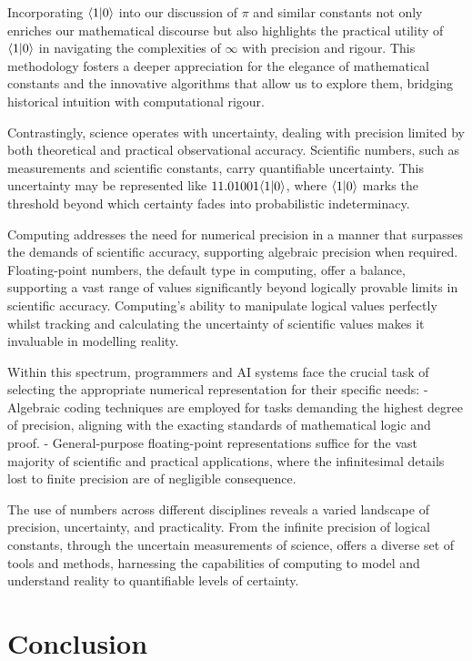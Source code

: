 \documentclass[12pt]{article}
\begin{document}
Incorporating \(\langle 1 | 0 \rangle\) into our discussion of \(\pi\) and similar constants not only enriches our mathematical discourse but also highlights the practical utility of \(\langle 1 | 0 \rangle\) in navigating the complexities of \(\infty\) with precision and rigour. This methodology fosters a deeper appreciation for the elegance of mathematical constants and the innovative algorithms that allow us to explore them, bridging historical intuition with computational rigour.

Contrastingly, science operates with uncertainty, dealing with precision limited by both theoretical and practical observational accuracy. Scientific numbers, such as measurements and scientific constants, carry quantifiable uncertainty. This uncertainty may be represented like \(11.01001\langle 1 | 0 \rangle\), where \(\langle 1 | 0 \rangle\) marks the threshold beyond which certainty fades into probabilistic indeterminacy.

Computing addresses the need for numerical precision in a manner that surpasses the demands of scientific accuracy, supporting algebraic precision when required. Floating-point numbers, the default type in computing, offer a balance, supporting a vast range of values significantly beyond logically provable \qbit{} limits in scientific accuracy. Computing's ability to manipulate logical values perfectly whilst tracking and calculating the uncertainty of scientific values makes it invaluable in modelling reality.

Within this spectrum, programmers and AI systems face the crucial task of selecting the appropriate numerical representation for their specific needs:
- Algebraic coding techniques are employed for tasks demanding the highest degree of precision, aligning with the exacting standards of mathematical logic and proof.
- General-purpose floating-point representations suffice for the vast majority of scientific and practical applications, where the infinitesimal details lost to finite precision are of negligible consequence.

The use of numbers across different disciplines reveals a varied landscape of precision, uncertainty, and practicality. From the infinite precision of logical constants, through the uncertain measurements of science, \iR{} offers a diverse set of tools and methods, harnessing the capabilities of computing to model and understand reality to quantifiable levels of certainty.

\section*{Conclusion}
\end{document}

